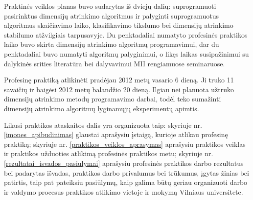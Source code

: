Praktinės veiklos planas buvo sudarytas iš dviejų dalių: suprogramuoti pasirinktus 
dimensijų atrinkimo algoritmus ir palyginti suprogramuotus algoritmus 
skaičiavimo laiko, klasifikavimo tikslumo bei dimensijų atrinkimo stabilumo 
atžvilgiais tarpusavyje. Du penktadaliai numatyto profesinės praktikos laiko 
buvo skirta dimensijų atrinkimo algoritmų programavimui, dar du penktadaliai 
buvo numatyti algoritmų palyginimui, o likęs laikas susipažinimui su dalykinės srities literatūra bei dalyvavimui MII rengiamuose seminaruose.

Profesinę praktiką atlikinėti pradėjau 2012 metų vasario 6 dieną. Ji truko 11 savaičių ir baigėsi 2012 metų balandžio 20 dieną. Ilgiau nei 
planuota užtruko dimensijų atrinkimo metodų programavimo darbai, todėl teko sumažinti dimensijų atrinkimo algoritmų lyginamųjų eksperimentų apimtis.

Likusi praktikos ataskaitos dalis yra organizuota taip: skyriuje nr. \ref{imones_apibudinimas} glaustai aprašysiu įstaigą, kurioje atlikau profesinę praktiką; skyriuje nr. \ref{praktikos_veiklos_aprasymas} aprašysiu praktikos veiklas ir praktikos užduoties atlikimą profesinės praktikos metu; skyriuje nr. \ref{rezultatai_isvados_pasiulymai} aprašysiu profesinės praktikos darbo rezultatus bei padarytas išvadas, praktikos darbo privalumus bei trūkumus, įgytas žinias bei patirtis, taip pat pateiksiu pasiūlymų, kaip galima būtų geriau organizuoti darbo ir valdymo procesus praktikos atlikimo vietoje ir mokymą Vilniaus universitete.